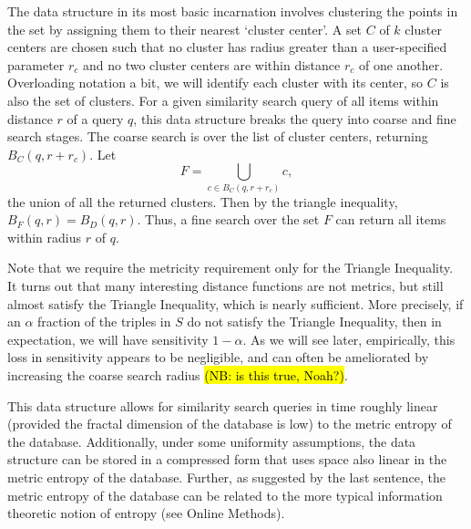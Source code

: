 \documentclass{amsbook}
\theoremstyle{definition}
\theoremstyle{remark}
\numberwithin{equation}{section}
\begin{document}
The data structure in its most basic incarnation involves clustering the points in the set by assigning them to their nearest `cluster center'.
A set $C$ of $k$ cluster centers are chosen such that no cluster has radius greater than a user-specified parameter $r_c$ and no two cluster centers are within distance $r_c$ of one another.
Overloading notation a bit, we will identify each cluster with its center, so $C$ is also the set of clusters.
For a given similarity search query of all items within distance $r$ of a query $q$, this data structure breaks the query into coarse and fine search stages.
The coarse search is over the list of cluster centers, returning $B_C(q,r + r_c)$.
Let \[\displaystyle F = \bigcup_{c \in B_C(q,r+r_c)} c , \] the union of all the returned clusters.
Then by the triangle inequality, $B_F(q,r) = B_D(q,r)$.
Thus, a fine search over the set $F$ can return all items within radius $r$ of $q$.

Note that we require the metricity requirement only for the Triangle Inequality.
It turns out that many interesting distance functions are not metrics, but still almost satisfy the Triangle Inequality, which is nearly sufficient.
More precisely, if an $\alpha$ fraction of the triples in $S$ do not satisfy the Triangle Inequality, then in expectation, we will have sensitivity $1 - \alpha$.
As we will see later, empirically, this loss in sensitivity appears to be negligible, and can often be ameliorated by increasing the coarse search radius \hl{(NB: is this true, Noah?)}.

This data structure allows for similarity search queries in time roughly linear (provided the fractal dimension of the database is low) to the metric entropy of the database.
Additionally, under some uniformity assumptions, the data structure can be stored in a compressed form that uses space also linear in the metric entropy of the database.
Further, as suggested by the last sentence, the metric entropy of the database can be related to the more typical information theoretic notion of entropy (see Online Methods).
\end{document}
